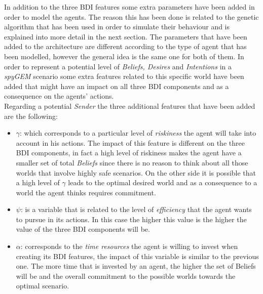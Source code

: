 \documentclass[a4paper]{article}
\begin{document}
In addition to the three BDI features some extra parameters have been added in order to model the agents. The reason this has been done is related to the genetic algorithm that has been used in order to simulate their behaviour and is explained into more detail in the next section. The parameters that have been added to the architecture are different according to the type of agent that has been modelled, however the general idea is the same one for both of them. In order to represent a potential level of \textit{Beliefs, Desires} and \textit{Intentions} in a \textit{spyGEM} scenario some extra features related to this specific world have been added that might have an impact on all three BDI components and as a consequence on the agents' actions. \\
Regarding a potential \textit{Sender} the three additional features that have been added are the following:
\begin{itemize}
\item $\gamma$: which corresponds to a particular level of \textit{riskiness} the agent will take into account in his actions. The impact of this feature is different on the three BDI components, in fact a high level of riskiness makes the agent have a smaller set of total \textit{Beliefs} since there is no reason to think about all those worlds that involve highly safe scenarios. On the other side it is possible that a high level of $\gamma$ leads to the optimal desired world and as a consequence to a world the agent thinks requires commitment.  
\item $\psi$: is a variable that is related to the level of \textit{efficiency} that the agent wants to pursue in its actions. In this case the higher this value is the higher the value of the three BDI components will be. 
\item $\alpha$: corresponds to the \textit{time resources} the agent is willing to invest when creating its BDI features, the impact of this variable is similar to the previous one. The more time that is invested by an agent, the higher the set of Beliefs will be and the overall commitment to the possible worlds towards the optimal scenario.
\end{itemize}
    
\end{document}
